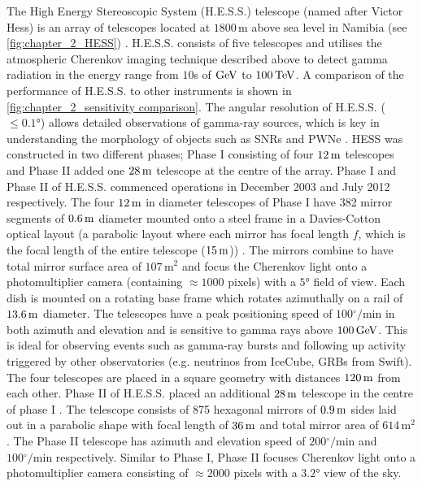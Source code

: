The High Energy Stereoscopic System (H.E.S.S.) telescope (named after Victor Hess) is an array of telescopes located at $1800\,\si{\m}$ above sea level in Namibia (see \autoref{fig:chapter_2_HESS}) \citep{HESS}. H.E.S.S. consists of five telescopes and utilises the atmospheric Cherenkov imaging technique described above to detect gamma radiation in the energy range from $10$s of $\si{\giga\electronvolt}$ to $100\,\TeV$. A comparison of the performance of H.E.S.S. to other instruments is shown in \autoref{fig:chapter_2_sensitivity comparison}. The angular resolution of H.E.S.S. ($\leq\ang{0.1}$) allows detailed observations of gamma-ray sources, which is key in understanding the morphology of objects such as SNRs and PWNe \citep{2018A&A...612A...1H}. HESS was constructed in two different phases; Phase I consisting of four $12\,\si{\meter}$ telescopes and Phase II added one $28\,\si{\meter}$ telescope at the centre of the array. Phase I and Phase II of H.E.S.S. commenced operations in December 2003 and July 2012 respectively. 
\newpar 
The four $12\,\si{\meter}$ in diameter telescopes of Phase I have 382 mirror segments of $0.6\,\si{\meter}$ diameter mounted onto a steel frame in a Davies-Cotton optical layout (a parabolic layout where each mirror has focal length $f$, which is the focal length of the entire telescope ($15\,\si{\meter}$)) \citep{2003APh....20..111B}. The mirrors combine to have total mirror surface area of $107\,\si{\meter\squared}$ and focus the Cherenkov light onto a photomultiplier camera (containing $\approx 1000$ pixels) with a $\ang{5}$ field of view. Each dish is mounted on a rotating base frame which rotates azimuthally on a rail of $13.6\,\si{\meter}$ diameter. The telescopes have a peak positioning speed of $100\si{^\circ\per\minute}$ in both azimuth and elevation and is sensitive to gamma rays above $100\,\si{\giga\electronvolt}$. This is ideal for observing events such as gamma-ray bursts and following up activity triggered by other observatories (e.g. neutrinos from IceCube, GRBs from Swift). The four telescopes are placed in a square geometry with distances $120\,\si{\meter}$ from each other.
\newpar
Phase II of H.E.S.S. placed an additional $28\,\si{\meter}$ telescope in the centre of phase I \citep{2005ICRC....5..163V}. The telescope consists of 875 hexagonal mirrors of $0.9\,\si{\meter}$ sides laid out in a parabolic shape with focal length of $36\,\si{\meter}$ and total mirror area of $614\,\si{\meter\squared}$. The Phase II telescope has azimuth and elevation speed of $200\si{^\circ\per\minute}$ and $100\si{^\circ\per\minute}$ respectively. Similar to Phase I, Phase II focuses Cherenkov light onto a photomultiplier camera consisting of $\approx 2000$ pixels with a $\ang{3.2}$ view of the sky.

